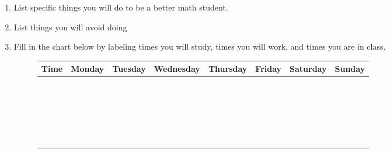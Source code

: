 \documentclass{article}
\begin{document}
\begin{enumerate}
\item List specific things you will do to be a better math student.

  \vfill
  
\item List things you will avoid doing

  \vfill

  \clearpage

  
\item Fill in the chart below by labeling times you will study, times you will work, and times you are in class.

  \begin{figure}[h!]
    \centering
  \begin{tabular}{|C{0.72in}|C{0.72in}|C{0.72in}|C{0.735in}|C{0.72in}|C{0.72in}|C{0.72in}|C{0.72in}|}
    \hline {} \textbf{Time} & \textbf{Monday} & \textbf{Tuesday} & \textbf{Wednesday} & \textbf{Thursday} & \textbf{Friday} & \textbf{Saturday} & \textbf{Sunday}\\ [0.1in] \hline
    &&&&&&&\\ [0.17in] \hline
    &&&&&&&\\ [0.17in] \hline
    &&&&&&&\\ [0.17in] \hline
    &&&&&&&\\ [0.17in] \hline
    &&&&&&&\\ [0.17in] \hline
    &&&&&&&\\ [0.17in] \hline
    &&&&&&&\\ [0.17in] \hline
    &&&&&&&\\ [0.17in] \hline
    &&&&&&&\\ [0.17in] \hline
    &&&&&&&\\ [0.17in] \hline
    &&&&&&&\\ [0.17in] \hline
    &&&&&&&\\ [0.17in] \hline
    &&&&&&&\\ [0.17in] \hline
    &&&&&&&\\ [0.17in] \hline
    &&&&&&&\\ [0.17in] \hline
    &&&&&&&\\ [0.17in] \hline
    &&&&&&&\\ [0.17in] \hline
    &&&&&&&\\ [0.17in] \hline
    &&&&&&&\\ [0.17in] \hline
    &&&&&&&\\ [0.17in] \hline
    &&&&&&&\\ [0.17in] \hline
    &&&&&&&\\ [0.17in] \hline
    &&&&&&&\\ [0.17in] \hline
    \end{tabular}
  \end{figure}

\end{enumerate}
\end{document}
